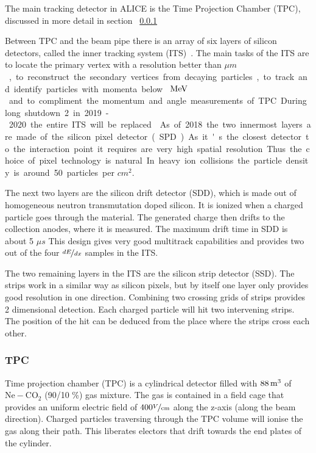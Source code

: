 The main tracking detector in ALICE is the Time Projection Chamber (TPC), discussed in more detail in section ~\ref{sec:TPC}

Between TPC and the beam pipe there is an array of six layers of silicon detectors, called the inner tracking system (ITS)~\cite{ITS}. The main tasks of the ITS are to locate the primary vertex with a resolution better than \unit[100]{$\mu m$}, to reconstruct the secondary vertices from decaying particles, to track and identify particles with momenta below \unit[200]{$\mbox{~MeV}$} and to compliment the momentum and angle measurements of TPC. During long shutdown 2 in 2019-2020 the entire ITS will be replaced~\cite{ITSupgrage}. As of 2018 the two innermost layers are made of the silicon pixel detector (SPD). As it's the closest detector to the interaction point it requires are very high spatial resolution. Thus the choice of pixel technology is natural. In heavy ion collisions the particle density is around 50 particles per $cm^2$. 

The next two layers are the silicon drift detector (SDD), which is made out of homogeneous neutron transmutation doped silicon. It is ionized when a charged particle goes through the material. The generated charge then drifts to the collection anodes, where it is measured. The maximum drift time in SDD is about 5 $\mu s$ This design gives very good multitrack capabilities and provides two out of the four $\nicefrac{dE}{dx}$ samples in the ITS.

The two remaining layers in the ITS are the silicon strip detector (SSD). The strips work in a similar way as silicon pixels, but by itself one layer only provides good resolution in one direction. Combining two crossing grids of strips provides 2 dimensional detection. Each charged particle will hit two intervening strips. The position of the hit can be deduced from the place where the strips cross each other.

\subsubsection{TPC}
\label{sec:TPC}
Time projection chamber (TPC) is a cylindrical detector filled with $ \unit[88]{m^3}$ of $\mathrm{Ne-CO_2}$ (90/10 \%) gas mixture. The gas is contained in a field cage that provides an uniform electric field of $400 \unit{\nicefrac{V}{cm}}$ along the z-axis (along the beam direction). Charged particles traversing through the TPC volume will ionise the gas along their path. This liberates electors that drift towards the end plates of the cylinder. 

